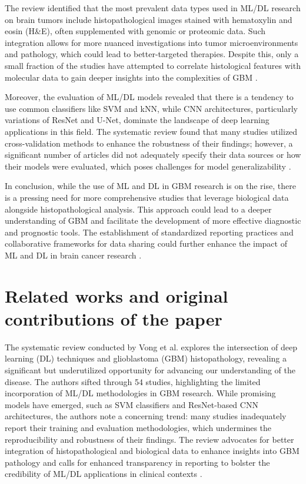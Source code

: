 \documentclass[runningheads]{llncs}
\begin{document}
The review identified that the most prevalent data types used in ML/DL research on brain tumors include histopathological images stained with hematoxylin and eosin (H\&E), often supplemented with genomic or proteomic data. Such integration allows for more nuanced investigations into tumor microenvironments and pathology, which could lead to better-targeted therapies. Despite this, only a small fraction of the studies have attempted to correlate histological features with molecular data to gain deeper insights into the complexities of GBM \cite{Chun_2025}.

Moreover, the evaluation of ML/DL models revealed that there is a tendency to use common classifiers like SVM and kNN, while CNN architectures, particularly variations of ResNet and U-Net, dominate the landscape of deep learning applications in this field. The systematic review found that many studies utilized cross-validation methods to enhance the robustness of their findings; however, a significant number of articles did not adequately specify their data sources or how their models were evaluated, which poses challenges for model generalizability \cite{Chun_2025}.

In conclusion, while the use of ML and DL in GBM research is on the rise, there is a pressing need for more comprehensive studies that leverage biological data alongside histopathological analysis. This approach could lead to a deeper understanding of GBM and facilitate the development of more effective diagnostic and prognostic tools. The establishment of standardized reporting practices and collaborative frameworks for data sharing could further enhance the impact of ML and DL in brain cancer research \cite{Chun_2025}.
\section{Related works and original contributions of the paper}
The systematic review conducted by Vong et al. explores the intersection of deep learning (DL) techniques and glioblastoma (GBM) histopathology, revealing a significant but underutilized opportunity for advancing our understanding of the disease. The authors sifted through 54 studies, highlighting the limited incorporation of ML/DL methodologies in GBM research. While promising models have emerged, such as SVM classifiers and ResNet-based CNN architectures, the authors note a concerning trend: many studies inadequately report their training and evaluation methodologies, which undermines the reproducibility and robustness of their findings. The review advocates for better integration of histopathological and biological data to enhance insights into GBM pathology and calls for enhanced transparency in reporting to bolster the credibility of ML/DL applications in clinical contexts \cite{Chun_2025}.
\end{document}
